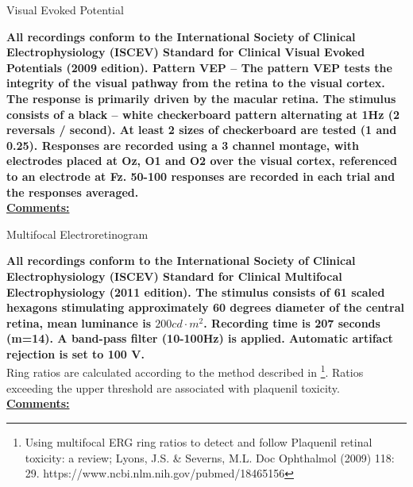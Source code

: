 \documentclass[12pt]{article}
\newenvironment{heading}
{\begin{flushleft}
	 \begin{large}
	\bfseries
}
{\end{large}
	\end{flushleft}
}
\newenvironment{boxed}
{\noindent\begin{lrbox}{\mybox}\begin{minipage}{\textwidth}}
{\end{minipage}\end{lrbox}\fbox{\usebox{\mybox}}}
\begin{document}
\begin{boxed}
\begin{heading}
Visual Evoked Potential
\end{heading}
{\footnotesize{\textbf{All recordings conform to the International Society of Clinical Electrophysiology (ISCEV) Standard for Clinical Visual Evoked Potentials (2009 edition). 
Pattern VEP – The pattern VEP tests the integrity of the visual pathway from the retina to the visual cortex. The response is primarily driven by the macular retina. The stimulus consists of a black – white checkerboard pattern alternating at 1Hz (2 reversals / second). At least 2 sizes of checkerboard are tested (1{\degree} and 0.25{\degree}). Responses are recorded using a 3 channel montage, with electrodes placed at Oz, O1 and O2 over the visual cortex, referenced to an electrode at Fz. 50-100 responses are recorded in each trial and the responses averaged.
}}}\\

\underline{\textbf{Comments:}} 
\end{boxed}

\begin{boxed}
\begin{heading}
Multifocal Electroretinogram
\end{heading}
{\footnotesize{\textbf{All recordings conform to the International Society of Clinical Electrophysiology (ISCEV) Standard for Clinical Multifocal Electrophysiology (2011 edition). The stimulus consists of 61 scaled hexagons stimulating approximately 60 degrees diameter of the central retina, mean luminance is $200 cd{\cdot}m^2$. Recording time is 207 seconds (m=14). A band-pass filter (10-100Hz) is applied. Automatic artifact rejection is set to 100 {\micro V}.}}\\
Ring ratios are calculated according to the method described in \footnote{Using multifocal ERG ring ratios to detect and follow Plaquenil retinal toxicity: a review; Lyons, J.S. \& Severns, M.L. Doc Ophthalmol (2009) 118: 29. https://www.ncbi.nlm.nih.gov/pubmed/18465156}. Ratios exceeding the upper threshold are associated with plaquenil toxicity.}\\


\flushleft
\underline{\textbf{Comments:}} 
\end{boxed}
\end{document}
